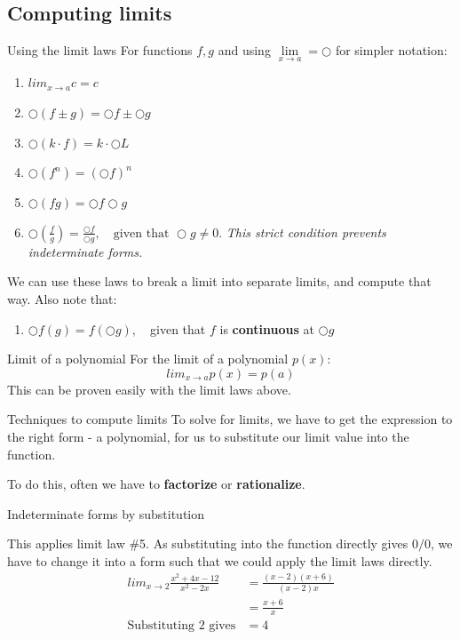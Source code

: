 \documentclass{article}
\begin{document}
\subsection{Computing limits}
\begin{theorem}
  {Using the limit laws}
  For functions $f,g$ and using $\mathop {\lim }\limits_{x \to a}=\bigcirc$ for simpler notation:
  \begin{enumerate}
    \item $lim_{x\to a}c=c$
    \item $\bigcirc(f\pm g)=\bigcirc f\pm \bigcirc g$
    \item $\bigcirc(k\cdot f)=k\cdot\bigcirc L$
    \item $\bigcirc(f^n)=(\bigcirc f)^n$
    \item $\bigcirc(fg)=\bigcirc f\bigcirc g$
    \item $\bigcirc(\frac{f}{g})=\frac{\bigcirc f}{\bigcirc g},\quad\text{given that }\bigcirc g\ne 0$. \emph{This strict condition prevents indeterminate forms.}
  \end{enumerate}
  We can use these laws to break a limit into separate limits, and compute that way. Also note that:
  \begin{enumerate}[start=7]
    \item $\bigcirc f(g)=f(\bigcirc g),\quad$given that $f$ is \textbf{continuous} at $\bigcirc g$
  \end{enumerate}
\end{theorem}
\begin{theorem}
  {Limit of a polynomial}
  For the limit of a polynomial $p(x)$:
  \[lim_{x\to a}p(x)=p(a)\]
  This can be proven easily with the limit laws above.
\end{theorem}
\begin{knBox}
  {Techniques to compute limits}
  To solve for limits, we have to get the expression to the right form - a polynomial, for us to substitute our limit value into the function.

  To do this, often we have to \textbf{factorize} or \textbf{rationalize}.
\end{knBox}
\begin{example}
  Indeterminate forms by substitution

  This applies limit law \#5. As substituting into the function directly gives $0/0$, we have to change it into a form such that we could apply the limit laws directly.
  \begin{align*}
    lim_{x\to 2}\frac{x^2+4x-12}{x^2-2x} & =\frac{(x-2)(x+6)}{(x-2)x} \\
                                         & =\frac{x+6}{x}             \\
    \text{Substituting 2 gives}          & =4
  \end{align*}
\end{example}
\end{document}
